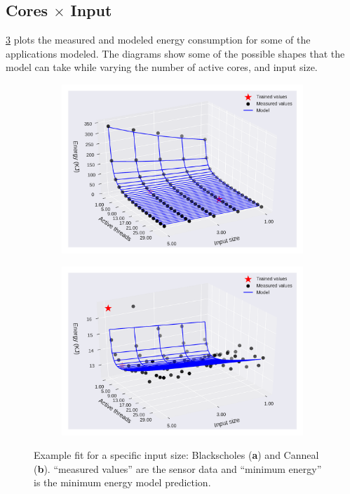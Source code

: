 \subsection{Cores $\times$ Input} \label{subsec:mvme_cores_x_input}
\cref{fig:en_eq_core_inp_ci} plots the measured and modeled energy consumption for some of the applications modeled. The diagrams  show some of the possible shapes that the model can take while varying the number of active cores, and input size.
\begin{figure}[H]
	\centering
	\captionsetup[subfigure]{justification=centering}
	\begin{subfigure}[b]{0.45\textwidth}
		\centerline{\includegraphics[width=\columnwidth]{models/figures/energy/cores_inps/completo_black_5.pdf}}
		\caption{}
		\label{fig:en_eq_black_ci}
	\end{subfigure}
	\begin{subfigure}[b]{0.45\textwidth}
		\centerline{\includegraphics[width=\columnwidth]{models/figures/energy/cores_inps/completo_canneal_1.pdf}}
		\caption{}
		\label{fig:en_eq_canneal_ci}
	\end{subfigure}
	
	\caption{Example fit for a specific input size: Blackscholes (\textbf{a}) and Canneal (\textbf{b}).  “measured values” are the sensor data and “minimum energy” is the minimum energy model prediction.
	}
	\label{fig:en_eq_core_inp_ci}
\end{figure}



